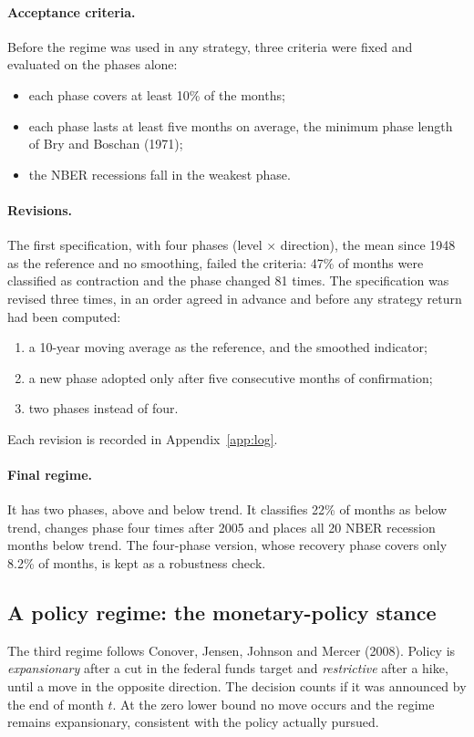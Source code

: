 \documentclass[11pt,a4paper]{article}
\begin{document}
\paragraph{Acceptance criteria.} Before the regime was used in any strategy, three criteria were fixed and evaluated on the phases alone:
\begin{itemize}
\item each phase covers at least 10\% of the months;
\item each phase lasts at least five months on average, the minimum phase length of Bry and Boschan (1971);
\item the NBER recessions fall in the weakest phase.
\end{itemize}

\paragraph{Revisions.} The first specification, with four phases (level $\times$ direction), the mean since 1948 as the reference and no smoothing, failed the criteria: 47\% of months were classified as contraction and the phase changed 81 times. The specification was revised three times, in an order agreed in advance and before any strategy return had been computed:
\begin{enumerate}
\item a 10-year moving average as the reference, and the smoothed indicator;
\item a new phase adopted only after five consecutive months of confirmation;
\item two phases instead of four.
\end{enumerate}
Each revision is recorded in Appendix~\ref{app:log}.

\paragraph{Final regime.} It has two phases, above and below trend. It classifies 22\% of months as below trend, changes phase four times after 2005 and places all 20 NBER recession months below trend. The four-phase version, whose recovery phase covers only 8.2\% of months, is kept as a robustness check.

\subsection{A policy regime: the monetary-policy stance}

The third regime follows Conover, Jensen, Johnson and Mercer (2008). Policy is \emph{expansionary} after a cut in the federal funds target and \emph{restrictive} after a hike, until a move in the opposite direction. The decision counts if it was announced by the end of month $t$. At the zero lower bound no move occurs and the regime remains expansionary, consistent with the policy actually pursued.
\end{document}
